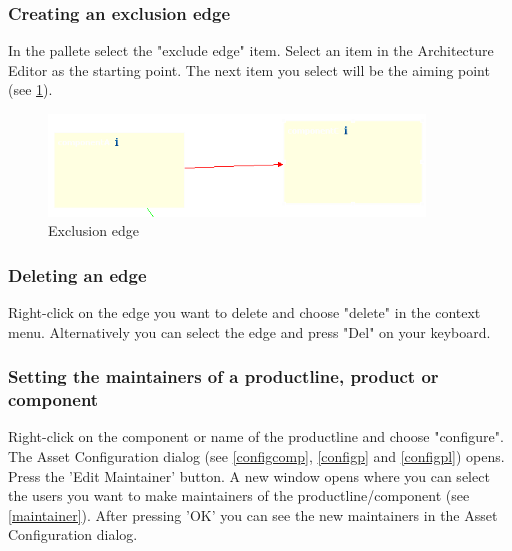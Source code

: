 \subsubsection{Creating an exclusion edge}

In the pallete select the "exclude edge" item. Select an item in the Architecture Editor
as the starting point. The next item you select will be the aiming point (see \ref{exclude}).

\begin{figure}[h!]
\begin{center}
\includegraphics[width=10cm]{exclude.png}
   \caption{Exclusion edge}
\label{exclude}
\end{center}
\end{figure}\par

\subsubsection{Deleting an edge}

Right-click on the edge you want to delete and choose "delete" in the context menu.
Alternatively you can select the edge and press "Del" on your keyboard.


\subsubsection{Setting the maintainers of a productline, product or component}
Right-click on the component or name of the productline and choose "configure". The Asset Configuration dialog (see \ref{configcomp}, \ref{configp} and \ref{configpl}) opens.
Press the 'Edit Maintainer' button. A new window opens where you can select the users you want to make maintainers of
the productline/component (see \ref{maintainer}). After pressing 'OK' you can see the new maintainers in the Asset Configuration
dialog.

